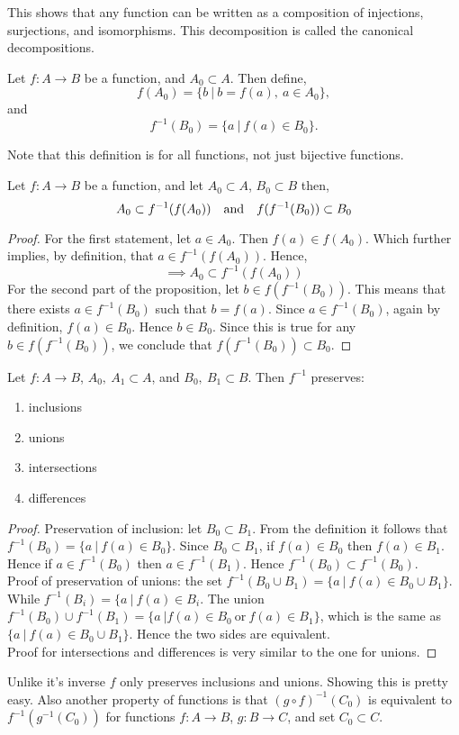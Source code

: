 This shows that any function can be written as a composition of injections, surjections, and isomorphisms. This decomposition is called the canonical decompositions. 
\begin{definition}
  Let $f:A\to B$ be a function, and $A_0 \subset A$. Then define,
  \[f(A_0) = \{b\ |\ b = f(a), \ a\in A_0 \},\]
  and
  \[f^{-1}(B_0) = \{a\ |\ f(a)\in B_0\}.\]
\end{definition}
Note that this definition is for all functions, not just bijective functions.
\begin{proposition}
  Let $f:A\to B$ be a function, and let $A_0 \subset A$, $B_0 \subset B$ then,
    \[A_0 \subset f^{-1}(f(A_0)) \qq{and} f(f^{-1}(B_0)) \subset B_0\]
\end{proposition}
\begin{proof}
  For the first statement, let $a\in A_0$. Then $f(a) \in f(A_0)$. Which further implies, by definition, that $a \in f^{-1}(f(A_0))$. Hence,
  \[\implies A_0 \subset f^{-1}(f(A_0)) \]
  For the second part of the proposition, let $b \in f(f^{-1}(B_0))$. This means that there exists $a\in f^{-1}(B_0)$ such that $b = f(a)$. Since $a \in f^{-1}(B_0)$, again by definition, $f(a) \in B_0$. Hence $b \in B_0$. Since this is true for any $b\in f(f^{-1}(B_0))$, we conclude that $f(f^{-1}(B_0)) \subset B_0$.
\end{proof}
\begin{proposition}
  Let \(f:A\to B\), \(A_0,\ A_1 \subset A\), and \(B_0,\ B_1\subset B\). Then \(f^{-1}\) preserves:
  \begin{enumerate}
    \item inclusions
    \item unions
    \item intersections
    \item differences
  \end{enumerate}
\end{proposition}
%
\begin{proof}
  Preservation of inclusion: let $B_0\subset B_1$. From the definition it follows that $f^{-1}(B_0) = \{a\ |\ f(a)\in B_0 \}$. Since $B_0 \subset B_1$, if $f(a)\in B_0$ then $f(a) \in B_1$. Hence if $a \in f^{-1}(B_0)$ then $a \in f^{-1}(B_1)$. Hence $f^{-1}(B_0)\subset f^{-1}(B_0)$. \\

 Proof of preservation of unions: the set $f^{-1}(B_0 \cup B_1) = \{a\ |\ f(a)\in B_0 \cup B_1\}$. While $f^{-1}(B_i) = \{a\ |\ f(a)\in B_i $. The union $f^{-1}(B_0)\cup f^{-1}(B_1) = \{a\ | f(a)\in B_0\ \text{or}\ f(a)\in B_1\}$, which is the same as $\{a\ |\ f(a)\in B_0 \cup B_1\}$. Hence the two sides are equivalent. \\

  Proof for intersections and differences is very similar to the one for unions.
\end{proof}
Unlike it's inverse $f$ only preserves inclusions and unions. Showing this is pretty easy. Also another property of functions is that $(g\circ f)^{-1}(C_0)$ is equivalent to $f^{-1}(g^{-1}(C_0))$ for functions $f:A\to B$, $g:B\to C$, and set $C_0 \subset C$.
